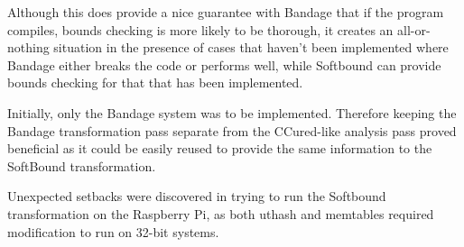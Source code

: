 \documentclass[a4paper,12pt,twoside,openright]{report}
\begin{document}
Although this does provide a nice guarantee with Bandage that if the program compiles, bounds checking is more likely to be thorough, it creates an all-or-nothing situation in the presence of cases that haven't been implemented where Bandage either breaks the code or performs well, while Softbound can provide bounds checking for that that has been implemented.

Initially, only the Bandage system was to be implemented.
Therefore keeping the Bandage transformation pass separate from the CCured-like analysis pass proved beneficial as it could be easily reused to provide the same information to the SoftBound transformation.

Unexpected setbacks were discovered in trying to run the Softbound transformation on the Raspberry Pi, as both uthash and memtables required modification to run on 32-bit systems.

\appendix
\singlespacing

 
 
\end{document}
